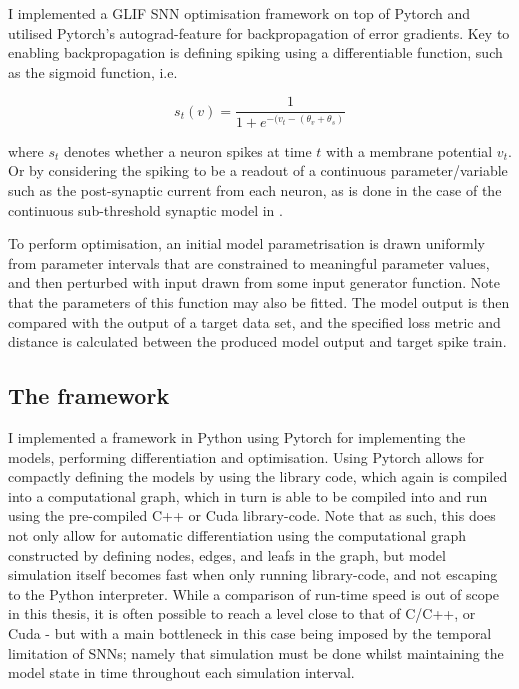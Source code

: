 \documentclass[mphil,deptreport,ai]{infthesis} %
\begin{document}
I implemented a GLIF SNN optimisation framework on top of Pytorch \cite{Paszke2017} and utilised Pytorch's autograd-feature for backpropagation of error gradients.
Key to enabling backpropagation is defining spiking using a differentiable function, such as the sigmoid function, i.e.

\begin{equation}
    s_t(v) = \frac{1}{1+e^{-(v_t-(\theta_v + \theta_s)}}
\end{equation}

where $s_t$ denotes whether a neuron spikes at time $t$ with a membrane potential $v_t$. Or by considering the spiking to be a readout of a continuous parameter/variable such as the post-synaptic current from each neuron, as is done in the case of the continuous sub-threshold synaptic model in \cite{Huh2017}.

To perform optimisation, an initial model parametrisation is drawn uniformly from parameter intervals that are constrained to meaningful parameter values, and then perturbed with input drawn from some input generator function. Note that the parameters of this function may also be fitted.
The model output is then compared with the output of a target data set, and the specified loss metric and distance is calculated between the produced model output and target spike train.

\subsection{The framework}

I implemented a framework in Python using Pytorch for implementing the models, performing differentiation and optimisation.
Using Pytorch allows for compactly defining the models by using the library code, which again is compiled into a computational graph, which in turn is able to be compiled into and run using the pre-compiled C++ or Cuda library-code.
Note that as such, this does not only allow for automatic differentiation using the computational graph constructed by defining nodes, edges, and leafs in the graph, but model simulation itself becomes fast when only running library-code, and not escaping to the Python interpreter.
While a comparison of run-time speed is out of scope in this thesis, it is often possible to reach a level close to that of C/C++, or Cuda - but with a main bottleneck in this case being imposed by the temporal limitation of SNNs; namely that simulation must be done whilst maintaining the model state in time throughout each simulation interval.
\end{document}
